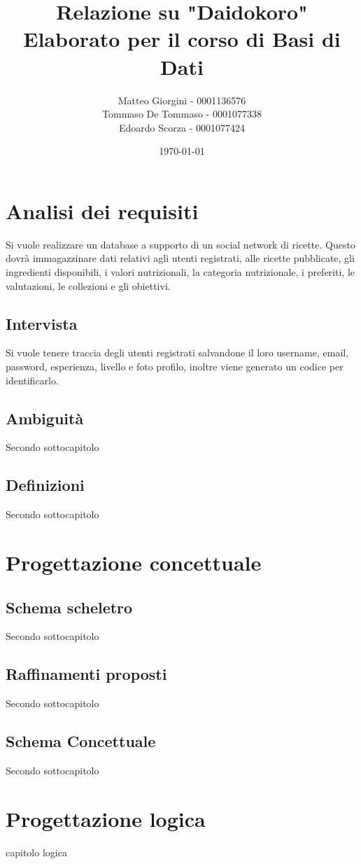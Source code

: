 ﻿\documentclass[a4paper,12pt]{report}
\title{Relazione su "Daidokoro" \\ Elaborato per il corso di Basi di Dati}
\author
{
    Matteo Giorgini - 0001136576 \\
    Tommaso De Tommaso - 0001077338 \\
    Edoardo Scorza - 0001077424 \\
}
\date{\today}
\begin{document}
\maketitle
\tableofcontents

\chapter{Analisi dei requisiti}
Si vuole realizzare un database a supporto di un social network di ricette.
Questo dovrà immagazzinare dati relativi agli utenti registrati, alle ricette pubblicate, gli ingredienti disponibili, i valori nutrizionali, la categoria nutrizionale, i preferiti, le valutazioni, le collezioni e gli obiettivi.

\section{Intervista}
Si vuole tenere traccia degli utenti registrati salvandone il loro username, email, password, esperienza, livello e foto profilo, inoltre viene generato un codice per identificarlo.

\section{Ambiguità}
Secondo sottocapitolo
\section{Definizioni}
Secondo sottocapitolo


\chapter{Progettazione concettuale}
\section{Schema scheletro}
Secondo sottocapitolo
\section{Raffinamenti proposti}
Secondo sottocapitolo
\section{Schema Concettuale}
Secondo sottocapitolo


\chapter{Progettazione logica}
capitolo logica
\end{document}
